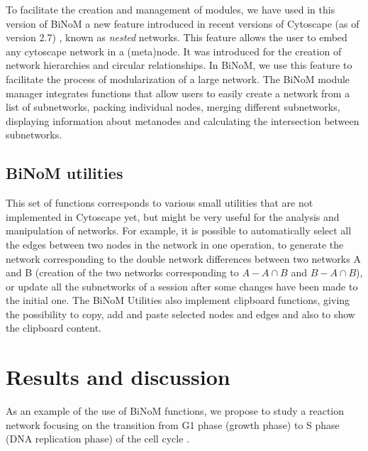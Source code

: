 \documentclass[10pt]{bmc_article}
\newenvironment{bmcformat}{\baselineskip20pt\sloppy\setboolean{publ}{false}}{\baselineskip20pt\sloppy}
\begin{document}
\begin{bmcformat}
To facilitate the creation and management of modules, we have used in this
version of BiNoM a new feature introduced in recent versions of Cytoscape (as of
version 2.7) \cite{cline2007integration}, known as \emph{nested} networks. This
feature allows the user to embed any cytoscape network in a (meta)node. It was
introduced for the creation of network hierarchies and circular
relationships. In BiNoM, we use this feature to facilitate the process of
modularization of a large network. The BiNoM module manager integrates
functions that allow users to easily create a network from a list of subnetworks,
packing individual nodes, merging different subnetworks, displaying information
about metanodes and calculating the intersection between subnetworks.

\subsection*{BiNoM utilities}
This set of functions corresponds to various small utilities that are not
implemented in Cytoscape yet, but might be very useful for the analysis and
manipulation of networks. For example, it is possible to automatically select
all the edges between two nodes in the network in one operation, to generate the
network corresponding to the double
network differences between two networks A and B (creation of the two networks
corresponding to $A - A \cap B$ and $B - A \cap B$), or update all the
subnetworks of
a session after some changes have been made to the initial one. The BiNoM
Utilities also implement
clipboard functions, giving the possibility to copy, add and paste
selected nodes and edges and also to show the clipboard content.


\section*{Results and discussion}
As an example of the use of BiNoM functions, we propose to study a reaction network focusing on the transition from G1 phase
(growth phase) to S phase (DNA replication phase) of the cell cycle
\cite{calzone2008comprehensive}.


\end{bmcformat}
\end{document}
